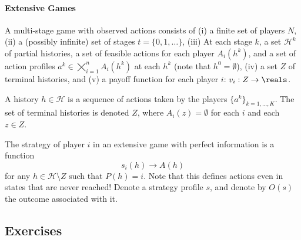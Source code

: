\documentclass[10pt]{article}
\begin{document}
\paragraph{Extensive Games}
\begin{definition}
	A multi-stage game with observed actions consists of (i) a finite set of players $N$, (ii) a (possibly infinite) set of stages $t = \{0,1,\dots\}$, (iii) At each stage $k$, a set $\mathcal{H}^k$ of partial histories, a set of feasible actions for each player $A_i(h^k)$, and a set of action profiles $a^k \in \bigtimes_{i=1}^n A_i(h^k)$ at each $h^k$ (note that $h^0 = \emptyset$), (iv) a set $Z$ of terminal histories, and (v) a payoff function for each player $i$: $v_i: Z \to \reals$.
\end{definition}
\begin{definition}
	A history $h \in \mathcal{H}$ is a sequence of actions taken by the players $\{a^k\}_{k=1,\dots,K}$. The set of terminal histories is denoted $Z$, where $A_i(z) = \emptyset$ for each $i$ and each $z \in Z$.
\end{definition}
\begin{definition}
	The strategy of player $i$ in an extensive game with perfect information is a function \[s_i(h) \to A(h)\]for any $h \in \mathcal{H} \setminus Z$ such that $P(h) = i$. Note that this defines actions even in states that are never reached! Denote a strategy profile $s$, and denote by $O(s)$ the outcome associated with it.
\end{definition}

\subsection{Exercises}
\end{document}
